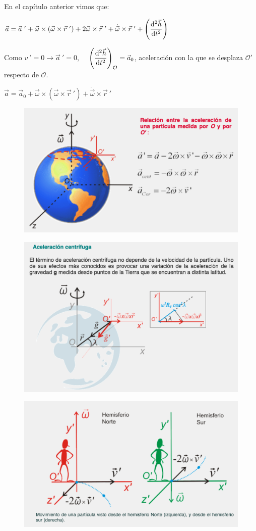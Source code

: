 En el capítulo anterior vimos que:

$\vec a=\vec a\ '+\vec \omega \times (\vec \omega \times \vec r\ ')+ 2 \vec \omega \times \vec r\ '+ \dot{\vec \omega}\times \vec r\ ' + \displaystyle \left( \dv[2]{\vec h}{t} \right)$

Como $v \ ' = 0 \to \vec a\ '=0$, $\quad \displaystyle \left( \dv[2]{\vec h}{t} \right)_{\mathcal {O}}=\vec a_0$, aceleración con la que se desplaza $\mathcal {O'}$ respecto de $\mathcal{O}$.

$\vec a=\vec a_0+\vec \omega \times (\vec \omega \times \vec r \ ' )+ \dot{\vec \omega}\times \vec r\ '$

\begin{figure}[H]
	\centering
	\includegraphics[width=.75\textwidth]{imagenes/imagenes10/T10IM10.png}
\end{figure}



\begin{figure}[H]
	\centering
	\includegraphics[width=.75\textwidth]{imagenes/imagenes10/T10IM11.png}
\end{figure}

\begin{figure}[H]
	\centering
	\includegraphics[width=.75\textwidth]{imagenes/imagenes10/T10IM12.png}
\end{figure}

